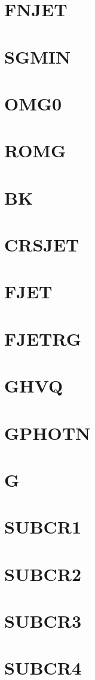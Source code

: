 \documentclass[14pt,UTF8]{ctexbook}
\begin{document}
\section{FNJET}
\section{SGMIN}
\section{OMG0}
\section{ROMG}
\section{BK}
\section{CRSJET}
\section{FJET}
\section{FJETRG}
\section{GHVQ}
\section{GPHOTN}
\section{G}
\section{SUBCR1}
\section{SUBCR2}
\section{SUBCR3}
\section{SUBCR4}
\end{document}

